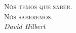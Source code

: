 \thispagestyle{empty}
\hbox{}

\vfill

\begin{flushright}
\begin{minipage}{.5\textwidth}
\begin{center}
  \textsc{Nós temos que saber.\\ Nós saberemos.} \\
  \textit{David Hilbert}
\end{center}
\end{minipage}
\end{flushright}
\pagebreak
